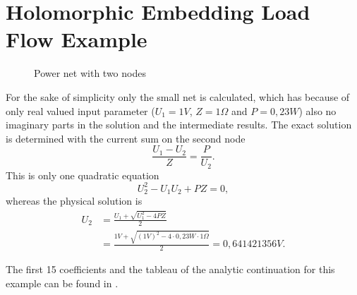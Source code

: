 \chapter{Holomorphic Embedding Load Flow Example}
\label{chap:helm_example}

\begin{figure}
	\centering
	
	\caption{Power net with two nodes}
	\label{fig:two_node_net}
\end{figure}

For the sake of simplicity only the small net  is calculated, which has because of only real valued input parameter ($U_1 = \si{1}{V}$, $Z = \si{1}{\Omega}$ and $P = \si{0,23}{W}$) also no imaginary parts in the solution and the intermediate results. The exact solution is determined with the current sum on the second node
\begin{equation}
	\frac{U_1 - U_2}{Z} = \frac{P}{U_2}.
\end{equation}
This is only one quadratic equation
\begin{equation}
	U_2^2 - U_1 U_2 + P Z = 0,
\end{equation}
whereas the physical solution is
\begin{align}
	U_2 & = \frac{U_1 + \sqrt{U_1^2 - 4 P Z}}{2} \\
		& = \frac{\si{1}{V} + \sqrt{(\si{1}{V})^2 - 4 \cdot \si{0,23}{W} \cdot \si{1}{\Omega}}}{2} = \si{0,641421356}{V}.
\end{align}

The first 15 coefficients and the tableau of the analytic continuation for this example can be found in .

